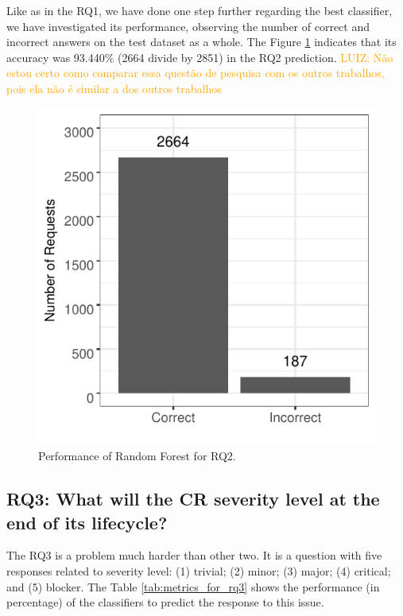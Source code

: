 \documentclass[10pt, conference]{IEEEtran}
\newcommand{\luiz}[1]{\noindent\textcolor{orange}{LUIZ: {#1}}}
\newcommand{\luiz}[1]{}
\begin{document}
Like as in the RQ1, we have done one step further regarding the best classifier, we have investigated its performance, observing the number of correct and incorrect answers on the test dataset as a whole. The Figure \ref{fig:rf_performance_for_q2} indicates that its accuracy was 93.440\% (2664 divide by 2851) in the RQ2 prediction. 
\luiz{Não estou certo como comparar essa questão de pesquisa com os outros trabalhos, pois ela não é similar a dos outros trabalhos}

\begin{figure}[!hbt]
   \label{fig:rf_performance_for_q2}
  \includegraphics{figures/rf_performance_for_q2.pdf}
  \caption{Performance of Random Forest for RQ2.}
\end{figure}

\subsection{RQ3: What will the CR severity level at the end of its lifecycle?}

The RQ3 is a problem much harder than other two. It is a question with five responses related to severity level: (1) trivial; (2) minor; (3) major; (4) critical; and (5) blocker. The Table \ref{tab:metrics_for_rq3} shows the performance (in percentage) of the classifiers to predict the response to this issue.
\end{document}
